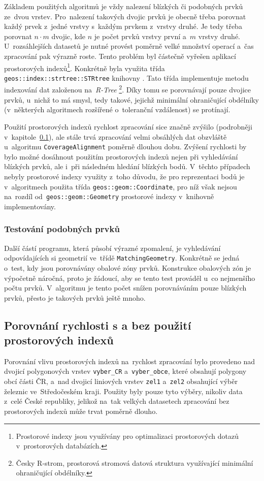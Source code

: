Základem použitých algoritmů je vždy nalezení blízkých či podobných prvků 
ze~dvou vrstev. Pro~nalezení takových dvojic prvků je obecně třeba porovnat 
každý prvek z~jedné vrstvy s~každým prvkem z~vrstvy druhé. Je tedy třeba 
porovnat $n\cdot m$ dvojic, kde $n$ je počet prvků vrstvy první a~$m$ vrstvy 
druhé. U~rozsáhlejších datasetů je nutné provést poměrně velké množství 
operací a~čas zpracování pak výrazně roste. Tento problém byl částečně vyřešen 
aplikací prostorových indexů\footnote{Prostorové indexy jsou využívány pro 
optimalizaci prostorových dotazů v~prostorových databázích.}. Konkrétně byla 
využita třída \texttt{geos::index::strtree::STRtree} knihovny  .
Tato třída implementuje metodu indexování dat založenou na~\textit{R-Tree}
\footnote{Česky R-strom, prostorová stromová datová struktura využívající 
minimální ohraničující obdélníky.}. Díky tomu se porovnávají pouze dvojice prvků, 
u~nichž to má smysl, tedy takové, jejichž minimální ohraničující obdélníky 
(v~některých algoritmech rozšířené o~toleranční vzdálenost) se protínají. 

Použití prostorových indexů rychlost zpracování sice značně zvýšilo (podrobněji 
v~kapitole~\ref{problemy-test}), ale stále trvá zpracování velmi obsáhlých dat 
obzvláště u~algo\-ritmu \texttt{Coverage\-Alignment} poměrně 
dlouhou dobu. Zvýšení rychlosti by bylo možné dosáhnout použitím prostorových 
indexů nejen při vyhledávání blízkých prvků, ale i~při následném hledání 
blízkých bodů. V~těchto případech nebyly prostorové indexy využity z~toho 
důvodu, že pro reprezentaci bodů je v~algoritmech použita třída 
\texttt{geos::geom::Coordinate}, pro níž však nejsou na~rozdíl 
od~\texttt{geos::geom::Geometry} prostorové indexy v~knihovně 
 implementovány.

\subsubsection{Testování podobných prvků}

Další částí programu, která působí výrazné zpomalení, je vyhledávání
odpovídajících si geometrií ve~třídě \texttt{MatchingGeometry}. Konkrétně
se jedná o~test, kdy jsou porovnávány obalové zóny prvků. Konstrukce
obalových zón je výpočetně náročná, proto je žádoucí, aby se tento test
prováděl u~co nejmenšího počtu prvků. V~algoritmu je tento počet snížen
porovnáváním pouze blízkých prvků, přesto je takových prvků ještě mnoho.


\subsection{Porovnání rychlosti s a bez použití prostorových indexů}
\label{problemy-test}
Porovnání vlivu prostorových indexů na~rychlost zpracování bylo provedeno 
nad dvojicí polygonových vrstev \texttt{vyber\_CR} a~\texttt{vyber\_obce}, 
které obsahují polygony obcí části ČR, a~nad dvojicí li\-niových vrstev 
\texttt{zel1} a~\texttt{zel2} obsahující výběr železnic ve~Středočeském 
kraji. Použity byly pouze tyto výběry, nikoliv data z~celé České republiky,
jelikož na~tak velkých datasetech zpracování bez prostorových indexů může 
trvat poměrně dlouho.

